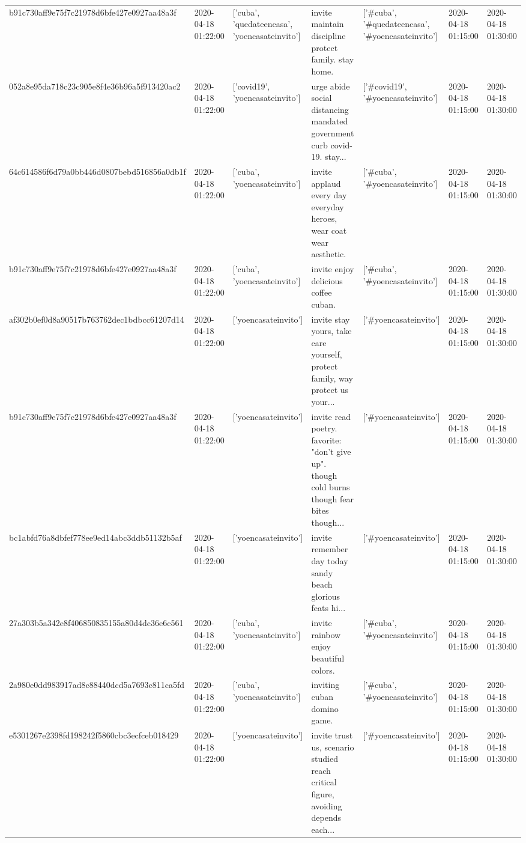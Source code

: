 \begin{tabular}{lllllll}
b91c730aff9e75f7c21978d6bfe427e0927aa48a3f & 2020-04-18 01:22:00 & ['cuba', 'quedateencasa', 'yoencasateinvito'] & invite maintain discipline protect family. stay home. & ['#cuba', '#quedateencasa', '#yoencasateinvito'] & 2020-04-18 01:15:00 & 2020-04-18 01:30:00 \\
052a8e95da718c23c905e8f4e36b96a5f913420ac2 & 2020-04-18 01:22:00 & ['covid19', 'yoencasateinvito'] & urge abide social distancing mandated government curb covid-19. stay... & ['#covid19', '#yoencasateinvito'] & 2020-04-18 01:15:00 & 2020-04-18 01:30:00 \\
64c614586f6d79a0bb446d0807bebd516856a0db1f & 2020-04-18 01:22:00 & ['cuba', 'yoencasateinvito'] & invite applaud every day everyday heroes, wear coat wear aesthetic. & ['#cuba', '#yoencasateinvito'] & 2020-04-18 01:15:00 & 2020-04-18 01:30:00 \\
b91c730aff9e75f7c21978d6bfe427e0927aa48a3f & 2020-04-18 01:22:00 & ['cuba', 'yoencasateinvito'] & invite enjoy delicious coffee cuban. & ['#cuba', '#yoencasateinvito'] & 2020-04-18 01:15:00 & 2020-04-18 01:30:00 \\
af302b0ef0d8a90517b763762dec1bdbcc61207d14 & 2020-04-18 01:22:00 & ['yoencasateinvito'] & invite stay yours, take care yourself, protect family, way protect us your... & ['#yoencasateinvito'] & 2020-04-18 01:15:00 & 2020-04-18 01:30:00 \\
b91c730aff9e75f7c21978d6bfe427e0927aa48a3f & 2020-04-18 01:22:00 & ['yoencasateinvito'] & invite read poetry. favorite: "don't give up". though cold burns though fear bites though... & ['#yoencasateinvito'] & 2020-04-18 01:15:00 & 2020-04-18 01:30:00 \\
bc1abfd76a8dbfef778ee9ed14abc3ddb51132b5af & 2020-04-18 01:22:00 & ['yoencasateinvito'] & invite remember day today sandy beach glorious feats hi... & ['#yoencasateinvito'] & 2020-04-18 01:15:00 & 2020-04-18 01:30:00 \\
27a303b5a342e8f406850835155a80d4dc36e6c561 & 2020-04-18 01:22:00 & ['cuba', 'yoencasateinvito'] & invite rainbow enjoy beautiful colors. & ['#cuba', '#yoencasateinvito'] & 2020-04-18 01:15:00 & 2020-04-18 01:30:00 \\
2a980e0dd983917ad8c88440dcd5a7693c811ca5fd & 2020-04-18 01:22:00 & ['cuba', 'yoencasateinvito'] & inviting cuban domino game. & ['#cuba', '#yoencasateinvito'] & 2020-04-18 01:15:00 & 2020-04-18 01:30:00 \\
e5301267e2398fd198242f5860cbc3ecfceb018429 & 2020-04-18 01:22:00 & ['yoencasateinvito'] & invite trust us, scenario studied reach critical figure, avoiding depends each... & ['#yoencasateinvito'] & 2020-04-18 01:15:00 & 2020-04-18 01:30:00 \\

\end{tabular}
